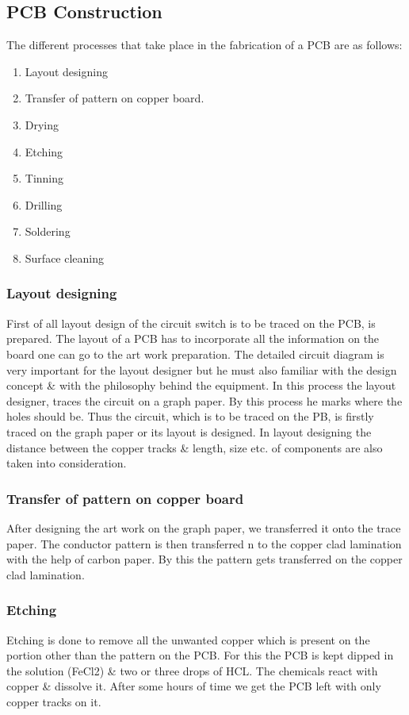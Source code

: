 \documentclass[12pt,a4paper,oneside,openright]{report}
\begin{document}
\subsection{PCB Construction}
The different processes that take place in the fabrication of a PCB are as follows:
\begin{enumerate}
 \item Layout designing
\item Transfer of pattern on copper board.
\item Drying 
\item Etching
\item Tinning
\item Drilling
\item Soldering
\item Surface cleaning
\end{enumerate}

\subsubsection{Layout designing}
First of all layout design of the circuit switch is to be traced on the PCB, is prepared. The layout of a PCB has to incorporate all the information on the board one can go to the art work preparation. The detailed circuit diagram is very important for the layout designer but he must also familiar with the design concept \& with the philosophy behind the equipment. In this process the layout designer, traces the circuit on a graph paper. By this process he marks where the holes should be. Thus the circuit, which is to be traced on the PB, is firstly traced on the graph paper or its layout is designed. In layout designing the distance between the copper tracks \& length, size etc. of components are also taken into consideration.
\subsubsection{Transfer of pattern on copper board}
After designing the art work on the graph paper, we transferred it onto the trace paper. The conductor pattern is then transferred n to the copper clad lamination with the help of carbon paper. By this the pattern gets transferred on the copper clad lamination.
\subsubsection{Etching}
Etching is done to remove all the unwanted copper which is present on the portion other than the pattern on the PCB. For this the PCB is kept dipped in the solution (FeCl2) \& two or three drops of HCL. The chemicals react with copper \& dissolve it. After some hours of time we get the PCB left with only copper tracks on it.
\end{document}
